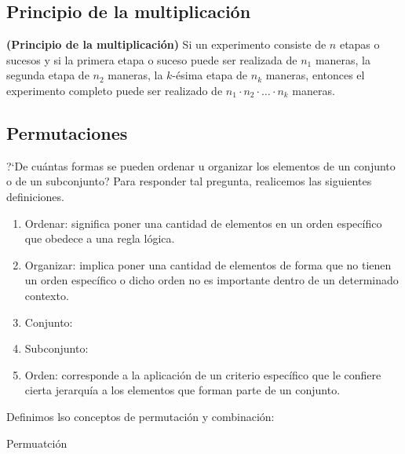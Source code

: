 \subsection{Principio de la multiplicaci\'on}
\begin{definition}{\bf (Principio de la multiplicaci\'on)}
    Si un experimento consiste de $n$ etapas o sucesos y si la primera etapa o suceso puede ser realizada de $n_{1}$ maneras, la segunda
    etapa de $n_{2}$ maneras, la $k$-\'esima etapa de $n_{k}$ maneras, entonces el experimento completo puede ser realizado
    de $n_{1}\cdot n_{2}\cdot\ldots\cdot n_{k}$ maneras.
\end{definition}


\subsection{Permutaciones}

?`De cu\'antas formas se pueden ordenar u organizar los elementos de un conjunto o de un subconjunto? Para responder tal pregunta, realicemos
las siguientes definiciones. 
\begin{definition}
    \hspace{0.5mm}
    \begin{enumerate}[{\rm 1.}]        
        \item {\rm Ordenar: } significa poner una cantidad de elementos en un orden espec\'ifico que obedece a una regla l\'ogica.
        \item {\rm Organizar: } implica poner una cantidad de elementos de forma que no tienen un orden espec\'ifico o dicho orden no es importante 
        dentro de un determinado contexto.
        \item {\rm Conjunto: } 
        \item {\rm Subconjunto: } 
        \item {\rm Orden: } corresponde a la aplicaci\'on de un criterio espec\'ifico que le confiere cierta jerarqu\'ia a los elementos que forman parte de un conjunto. 
        
    \end{enumerate}
\end{definition}

Definimos lso conceptos de permutaci\'on y combinaci\'on: 

\begin{definition}{Permuatci\'on}

\end{definition}

